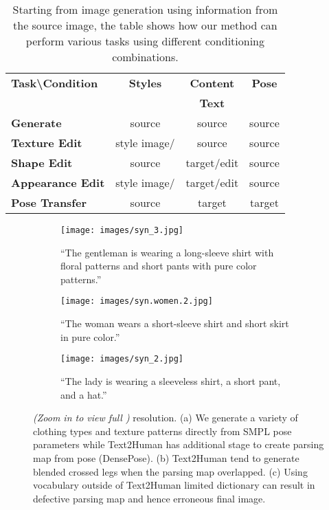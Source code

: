 \documentclass[10pt,twocolumn,letterpaper]{article}
\begin{document}
\begin{table}[]
\begin{center}
\begin{tabular}{l|c|c|c} 
\toprule
\textbf{Task\textbackslash Condition}  & \textbf{Styles} & \textbf{Content} & \textbf{Pose} \\
& &\textbf{Text} & \\
\toprule
\textbf{Generate} & source & source & source \\
\textbf{Texture Edit}  & style image/ & source & source \\
\textbf{Shape Edit}  & source &  target/edit & source \\
\textbf{Appearance Edit}  & style image/  & target/edit & source \\
\textbf{Pose Transfer}  & source & target & target  \\
\bottomrule
\end{tabular}
\caption{Starting from image generation using information from the source image, the table shows how our method can perform various tasks using different conditioning combinations.}
\label{table:edit}
\end{center}
\end{table}
\vspace{-4mm}
\begin{figure*}[ht]
\centering
    \begin{subfigure}[b]{0.8\textwidth}
    \texttt{[image: images/syn\_3.jpg]}
    \caption{``The gentleman is wearing a long-sleeve shirt with floral patterns and short pants with pure color patterns.''}
    \label{fig:synthesis_man}
    \end{subfigure}    
    \begin{subfigure}[b]{0.8\textwidth}
    \texttt{[image: images/syn.women.2.jpg]}
    \caption{``The woman wears a short-sleeve shirt and short skirt in pure color.''}
    \label{fig:synthesis_leg}    
    \end{subfigure}
    \begin{subfigure}[b]{0.8\textwidth}
    \texttt{[image: images/syn\_2.jpg]}
    \caption{``The lady is wearing a sleeveless shirt, a short pant, and a hat.''}
    \label{fig:ssynthesis_pant}
    \end{subfigure}      
\caption{\textit{(Zoom in to view full )} resolution. (a) We generate a variety of clothing types and texture patterns directly from SMPL pose parameters while Text2Human has additional stage to create parsing map from pose (DensePose\cite{densepose}). (b) Text2Human tend to generate blended crossed legs when the parsing map overlapped. (c) Using vocabulary outside of Text2Human limited dictionary can result in defective parsing map and hence erroneous final image.}
\label{fig:synthesis}
\end{figure*}
\end{document}
